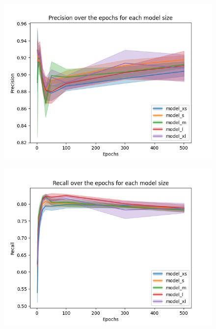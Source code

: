 \begin{figure}[!htbp]
    \centering
    \begin{minipage}[t]{.5\textwidth}%
      \centering
      \includegraphics[width=1.1\linewidth]{Figures/results/yolov8/precision_over_epochs_standard_sizes.png}
      \label{fig:yolov8_visulization_precision_standard_models}
    \end{minipage}%
    \begin{minipage}[t]{.5\textwidth}%
      \centering
      \includegraphics[width=1.1\linewidth ]{Figures/results/yolov8/recall_over_epochs_standard_sizes.png}
      \label{fig:yolov8_visulization_recall_standard_models}
    \end{minipage}
\end{figure}

